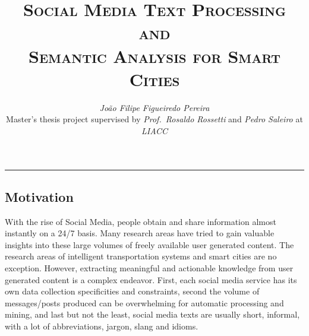 \documentclass[9pt,a4paper]{extarticle}
\begin{document}
\title{\vspace*{-8mm}\textbf{\textsc{Social Media Text Processing and\\ Semantic Analysis for Smart Cities}}}
\author{\emph{João Filipe Figueiredo Pereira}\\[2mm]
\small{Master’s thesis project supervised by \emph{Prof.\ Rosaldo Rossetti} and \emph{Pedro Saleiro} at \emph{LIACC}}}
\date{}
\maketitle
\thispagestyle{empty}

\vspace*{-4mm}\noindent\rule{\textwidth}{0.4pt}\vspace*{4mm}

\begin{multicols}{2}

\section{Motivation}\label{sec:motivation}



With the rise of Social Media, people obtain and share information almost instantly on a 24/7 basis. Many research areas have tried to gain valuable insights into these large volumes of freely available user generated content. The research areas of intelligent transportation systems and smart cities are no exception. However, extracting meaningful and actionable knowledge from user generated content is a complex endeavor. First, each social media service has its own data collection specificities and constraints, second the volume of messages/posts produced can be overwhelming for automatic processing and mining, and last but not the least, social media texts are usually short, informal, with a lot of abbreviations, jargon, slang and idioms.


\end{multicols}
\end{document}
